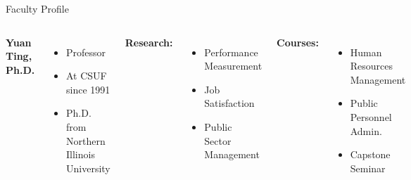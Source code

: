 \documentclass[10pt]{beamer}
\newlength{\imageheight}
\begin{document}
\begin{frame}{Faculty Profile}
\begin{columns}[T]
\textbf{Yuan Ting, Ph.D.}
\begin{itemize}
\item Professor
\item At CSUF since 1991
\item Ph.D. from Northern Illinois University
\end{itemize}

\textbf{Research:}
\begin{itemize}
\item Performance Measurement
\item Job Satisfaction
\item Public Sector Management
\end{itemize}

\textbf{Courses:}
\begin{itemize}
\item Human Resources Management
\item Public Personnel Admin.
\item Capstone Seminar
\end{itemize}
\vspace*{0.5cm}
\includegraphics[height=\imageheight]{images/ting.jpg}
\end{columns}
\end{frame}
\end{document}
